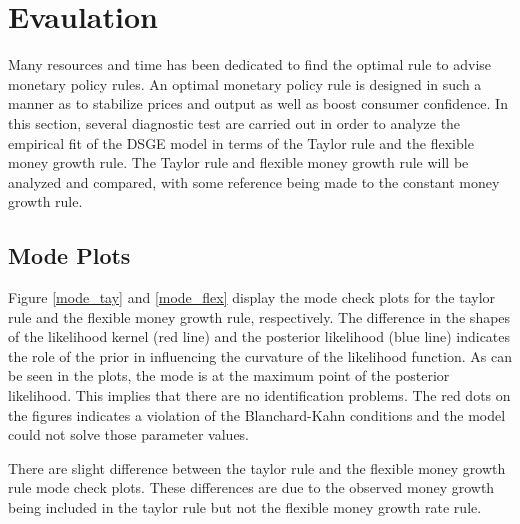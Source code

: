 \documentclass[11pt,preprint, authoryear]{elsarticle}
\numberwithin{equation}{section}
\numberwithin{figure}{section}
\numberwithin{table}{section}
\begin{document}
\hypertarget{evaulation}{%
\section{Evaulation}\label{evaulation}}

Many resources and time has been dedicated to find the optimal rule to
advise monetary policy rules. An optimal monetary policy rule is
designed in such a manner as to stabilize prices and output as well as
boost consumer confidence. In this section, several diagnostic test are
carried out in order to analyze the empirical fit of the DSGE model in
terms of the Taylor rule and the flexible money growth rule. The Taylor
rule and flexible money growth rule will be analyzed and compared, with
some reference being made to the constant money growth rule.

\hypertarget{mode-plots}{%
\subsection{Mode Plots}\label{mode-plots}}

Figure \ref{mode_tay} and \ref{mode_flex} display the mode check plots
for the taylor rule and the flexible money growth rule, respectively.
The difference in the shapes of the likelihood kernel (red line) and the
posterior likelihood (blue line) indicates the role of the prior in
influencing the curvature of the likelihood function. As can be seen in
the plots, the mode is at the maximum point of the posterior likelihood.
This implies that there are no identification problems. The red dots on
the figures indicates a violation of the Blanchard-Kahn conditions and
the model could not solve those parameter values.

There are slight difference between the taylor rule and the flexible
money growth rule mode check plots. These differences are due to the
observed money growth being included in the taylor rule but not the
flexible money growth rate rule.
\end{document}
